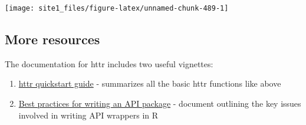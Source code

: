 \documentclass[]{book}
\newenvironment{Shaded}{\begin{snugshade}}{\end{snugshade}}
\newcommand{\CommentTok}[1]{\textcolor[rgb]{0.56,0.35,0.01}{\textit{#1}}}
\newcommand{\DataTypeTok}[1]{\textcolor[rgb]{0.13,0.29,0.53}{#1}}
\newcommand{\DecValTok}[1]{\textcolor[rgb]{0.00,0.00,0.81}{#1}}
\newcommand{\KeywordTok}[1]{\textcolor[rgb]{0.13,0.29,0.53}{\textbf{#1}}}
\newcommand{\NormalTok}[1]{#1}
\newcommand{\OperatorTok}[1]{\textcolor[rgb]{0.81,0.36,0.00}{\textbf{#1}}}
\newcommand{\StringTok}[1]{\textcolor[rgb]{0.31,0.60,0.02}{#1}}
\providecommand{\tightlist}{%
  \setlength{\itemsep}{0pt}\setlength{\parskip}{0pt}}
\begin{document}
\begin{Shaded}
\end{Shaded}

\begin{center}\texttt{[image: site1\_files/figure-latex/unnamed-chunk-489-1]} \end{center}

\hypertarget{more-resources-1}{%
\subsection{More resources}\label{more-resources-1}}

The documentation for httr includes two useful vignettes:

\begin{enumerate}
\def\labelenumi{\arabic{enumi}.}
\tightlist
\item
  \href{https://cran.r-project.org/web/packages/httr/vignettes/quickstart.html}{httr quickstart guide} - summarizes all the basic httr functions like above
\item
  \href{https://cran.r-project.org/web/packages/httr/vignettes/api-packages.html}{Best practices for writing an API package} - document outlining the key issues involved in writing API wrappers in R
\end{enumerate}
\end{document}
